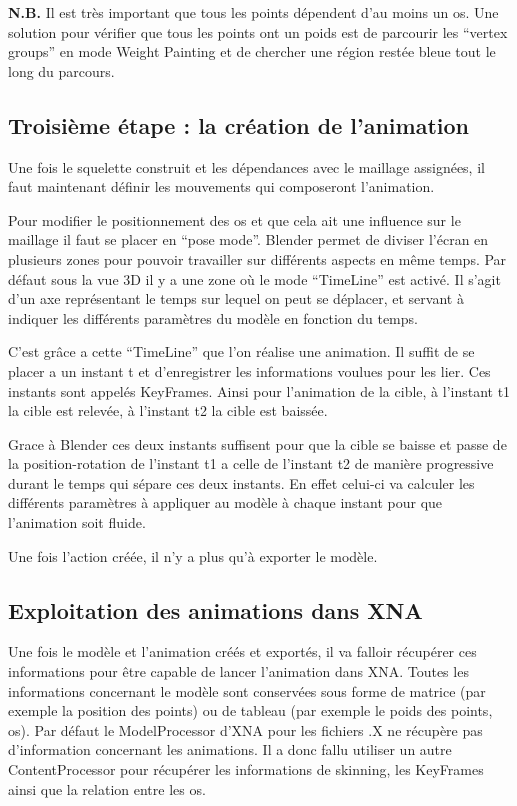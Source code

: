 \documentclass[11pt]{report}
\begin{document}
\noindent\textbf{N.B.} Il est très important que tous les points dépendent d’au moins un os. Une solution pour vérifier que tous les points ont un poids est de parcourir les ``vertex groups'' en mode Weight Painting et de chercher une région restée bleue tout le long du parcours.

\subsection{Troisième étape : la création de l’animation}

Une fois le squelette construit et les dépendances avec le maillage assignées, il faut maintenant définir les mouvements qui composeront l’animation.

Pour modifier le positionnement des os et que cela ait une influence sur le maillage il faut se placer en ``pose mode''.  Blender permet de diviser l’écran en plusieurs zones pour pouvoir travailler sur différents aspects en même temps. Par défaut sous la vue 3D il y a une zone où le mode ``TimeLine'' est activé. Il s’agit d’un axe représentant le temps sur lequel on peut se déplacer, et servant à indiquer les différents paramètres du modèle en fonction du temps.

C’est grâce a cette ``TimeLine'' que l’on réalise une animation. Il suffit de se placer a un instant t et d’enregistrer les informations voulues pour les lier. Ces instants sont appelés KeyFrames. Ainsi pour l’animation de la cible, à l’instant t1 la cible est relevée, à l’instant t2 la cible est baissée.

Grace à Blender ces deux instants suffisent pour que la cible se baisse et passe de la position-rotation de l’instant t1 a celle de l’instant t2 de manière progressive durant le temps qui sépare ces deux instants. En effet celui-ci va calculer les différents paramètres  à appliquer au modèle à chaque instant pour que l’animation soit fluide.

Une fois l’action créée, il n’y a plus qu’à exporter le modèle.

\subsection{Exploitation des animations dans XNA}

Une fois le modèle et l’animation créés et exportés, il va falloir récupérer ces informations pour être capable de lancer l’animation dans XNA. Toutes les informations concernant le modèle sont conservées sous forme de matrice (par exemple la position des points) ou de tableau (par exemple le poids des points, os). 
Par défaut le ModelProcessor d’XNA pour les fichiers .X ne récupère pas d’information concernant les animations. Il a donc fallu utiliser un autre ContentProcessor pour récupérer les informations de skinning, les  KeyFrames ainsi que la relation entre les os.
\end{document}
